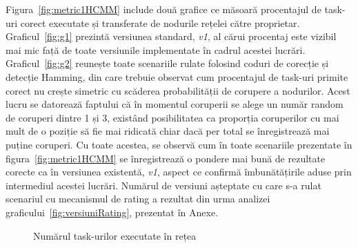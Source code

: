 \documentclass[12pt,a4paper]{report}
\begin{document}
Figura~\ref{fig:metric1HCMM} include două grafice ce măsoară procentajul de task-uri corect executate și transferate de nodurile rețelei către proprietar. Graficul~\ref{fig:g1} prezintă versiunea standard, \textit{v1}, al cărui procentaj este vizibil mai mic față de toate versiunile implementate în cadrul acestei lucrări. Graficul~\ref{fig:g2} reunește toate scenariile rulate folosind coduri de corecție și detecție Hamming, din care trebuie observat cum procentajul de task-uri primite corect nu crește simetric cu scăderea probabilității de corupere a nodurilor. Acest lucru se datorează faptului că în momentul coruperii se alege un număr random de coruperi dintre 1 și 3, existând posibilitatea ca proporția coruperilor cu mai mult de o poziție să fie mai ridicată chiar dacă per total se înregistrează mai puține coruperi. Cu toate acestea, se observă cum în toate scenariile prezentate în figura~\ref{fig:metric1HCMM} se înregistrează o pondere mai bună de rezultate corecte ca în versiunea existentă, \textit{v1}, aspect ce confirmă îmbunătățirile aduse prin intermediul acestei lucrări. Numărul de versiuni așteptate cu care s-a rulat scenariul cu mecanismul de rating a rezultat din urma analizei graficului~\ref{fig:versiuniRating}, prezentat în Anexe.

\begin{figure}%
    \centering
    \qquad
    \caption{Numărul task-urilor executate în rețea}%
    \label{fig:metric2HCMM}%
\end{figure}
\end{document}
